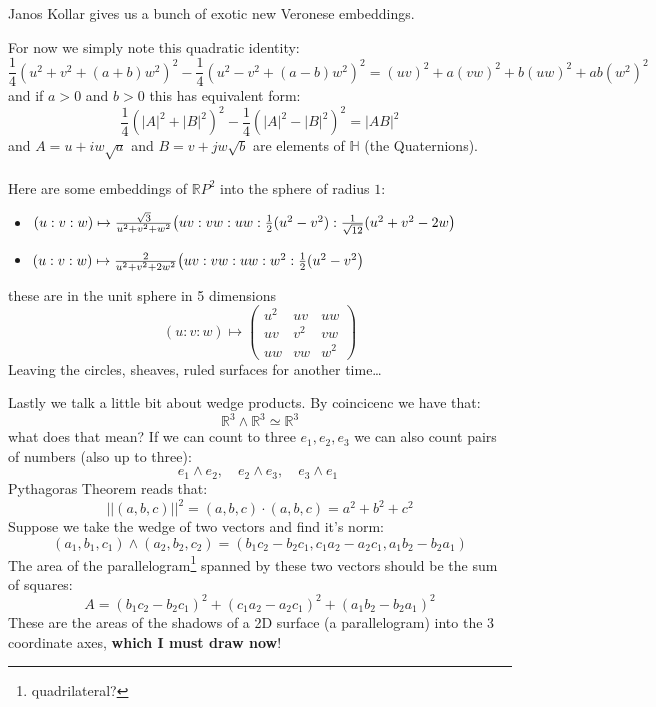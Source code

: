 \documentclass[12pt]{article}
\begin{document}
Janos Kollar gives us a bunch of exotic new Veronese embeddings.  

\newpage

\noindent For now we simply note this quadratic identity:
$$
\frac{1}{4}(u^2 + v^2 + (a+b)w^2)^2 - 
\frac{1}{4}(u^2 - v^2 + (a-b)w^2)^2 =
(uv)^2 + a(vw)^2 + b(uw)^2 + ab(w^2)^2
 $$
 and if $a > 0$ and $b > 0$ this has equivalent form:
$$ \frac{1}{4}(|A|^2 + |B|^2)^2
- \frac{1}{4}(|A|^2 - |B|^2)^2
=|AB|^2 $$
and $A = u + iw \sqrt{a}$ and $B = v + jw\sqrt{b}$ are elements of $\mathbb{H}$ (the Quaternions). \\ \\
Here are some embeddings of $\mathbb{R}P^2$ into the sphere of radius $1$:
\begin{itemize}
\item $(u:v:w)\mapsto \\ \frac{\sqrt{3}}{u^2 + v^2 + w^2} \big( uv:vw:uw:\frac{1}{2}(u^2 - v^2): \frac{1}{\sqrt{12}} (u^2 + v^2 - 2w \big) $
\\
\item $(u:v:w) \mapsto \\\frac{2}{u^2 + v^2 + 2w^2} \big( uv:vw:uw: w^2 : \frac{1}{2}(u^2 - v^2\big) $
\end{itemize}
these are in the unit sphere in 5 dimensions 
$$ (u:v:w) \mapsto \left(\begin{array}{ccc}
u^2 & uv & uw \\
uv & v^2 & vw \\
uw & vw & w^2 \end{array}\right)$$
Leaving the circles,  sheaves, ruled surfaces for another time\dots 

\newpage

\noindent Lastly we talk a little bit about wedge products.  By coincicenc we have that:
$$ \mathbb{R}^3 \wedge \mathbb{R}^3 \simeq \mathbb{R}^3 $$
what does that mean?  If we can count to three $e_1, e_2, e_3$ we can also count pairs of numbers (also up to three):
$$ e_1 \wedge e_2, \quad e_2 \wedge e_3, \quad
e_3 \wedge e_1 \; $$
Pythagoras Theorem reads that:
$$ ||(a,b,c)||^2 = (a,b,c) \cdot (a,b,c) = a^2 + b^2 + c^2 $$
Suppose we take the wedge of two vectors and find it's norm:
$$ (a_1,b_1,c_1) \wedge (a_2, b_2, c_2)
= ( b_1 c_2 - b_2 c_1 ,
c_1 a_2 - a_2 c_1 ,
a_1 b_2 - b_2 a_1  ) $$
The area of the parallelogram\footnote{quadrilateral?} spanned by these two vectors
should be the sum of squares:
$$ A = 
( b_1 c_2 - b_2 c_1)^2+
( c_1 a_2 - a_2 c_1)^2+ 
( a_1 b_2 - b_2 a_1)^2$$
These are the areas of the shadows of a 2D surface (a parallelogram) into the 3 coordinate axes, \textbf{which I must draw now}!
\newpage
\end{document}
